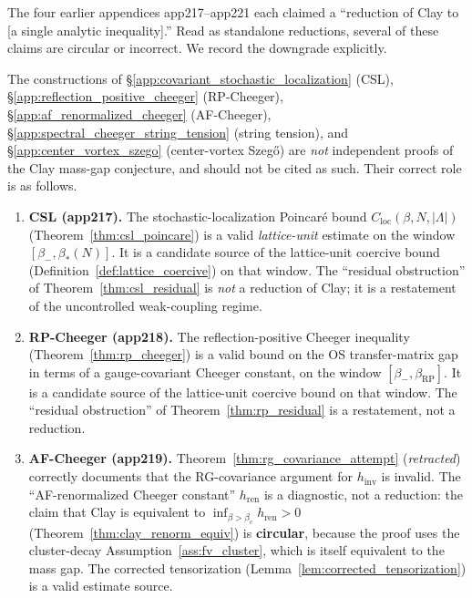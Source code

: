 The four earlier appendices app217--app221 each claimed a
``reduction of Clay to [a single analytic inequality].'' Read as
standalone reductions, several of these claims are circular or
incorrect. We record the downgrade explicitly.

\begin{theorem}
\label{thm:downgrade}
The constructions of
\S\ref{app:covariant_stochastic_localization} (CSL),
\S\ref{app:reflection_positive_cheeger} (RP-Cheeger),
\S\ref{app:af_renormalized_cheeger} (AF-Cheeger),
\S\ref{app:spectral_cheeger_string_tension} (string tension), and
\S\ref{app:center_vortex_szego} (center-vortex Szeg\H{o}) are
\emph{not} independent proofs of the Clay mass-gap conjecture, and
should not be cited as such. Their correct role is as follows.
\begin{enumerate}
\item \textbf{CSL (app217).} The stochastic-localization Poincar\'e
bound $C_{\mathrm{loc}}(\beta,N,|\Lambda|)$
(Theorem~\ref{thm:csl_poincare}) is a valid \emph{lattice-unit}
estimate on the window $[\beta_{-},\beta_{*}(N)]$. It is a
candidate source of the lattice-unit coercive bound
(Definition~\ref{def:lattice_coercive}) on that window. The
``residual obstruction'' of Theorem~\ref{thm:csl_residual} is
\emph{not} a reduction of Clay; it is a restatement of the
uncontrolled weak-coupling regime.

\item \textbf{RP-Cheeger (app218).} The reflection-positive Cheeger
inequality (Theorem~\ref{thm:rp_cheeger}) is a valid bound on the
OS transfer-matrix gap in terms of a gauge-covariant Cheeger
constant, on the window $[\beta_{-},\beta_{\mathrm{RP}}]$. It is a
candidate source of the lattice-unit coercive bound on that window.
The ``residual obstruction'' of Theorem~\ref{thm:rp_residual} is a
restatement, not a reduction.

\item \textbf{AF-Cheeger (app219).} Theorem~\ref{thm:rg_covariance_attempt}
(\emph{retracted}) correctly documents that the RG-covariance
argument for $h_{\mathrm{inv}}$ is invalid. The
``AF-renormalized Cheeger constant'' $h_{\mathrm{ren}}$ is a
diagnostic, not a reduction: the claim that Clay is equivalent to
$\inf_{\beta>\beta_{c}}h_{\mathrm{ren}}>0$
(Theorem~\ref{thm:clay_renorm_equiv}) is \textbf{circular}, because
the proof uses the cluster-decay Assumption~\ref{ass:fv_cluster},
which is itself equivalent to the mass gap. The
corrected tensorization (Lemma~\ref{lem:corrected_tensorization})
is a valid estimate source.


\end{enumerate}
\end{theorem}

